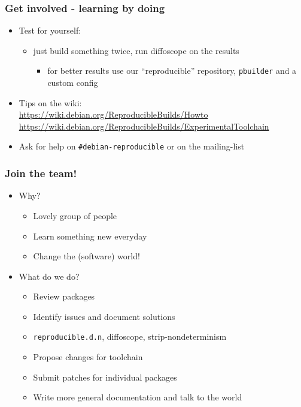 \documentclass[14pt]{beamer}
\begin{document}
\begin{frame}
 \frametitle{Get involved - learning by doing}

 \begin{itemize}
  \item Test for yourself:
   \begin{itemize}
    \item just build something twice, run diffoscope on the results
    \begin{itemize}
     \item for better results use our “reproducible” repository, \texttt{pbuilder} and a custom config
    \end{itemize}
   \end{itemize}
  \item Tips on the wiki: \\
    \small{\url{https://wiki.debian.org/ReproducibleBuilds/Howto}} \\
    \small{\url{https://wiki.debian.org/ReproducibleBuilds/ExperimentalToolchain}}
  \item Ask for help on \texttt{\#debian-reproducible} or on the mailing-list
 \end{itemize}
\end{frame}

\begin{frame}
 \frametitle{Join the team!}

 \begin{itemize}
  \item Why?
   \begin{itemize}
    \item \heartsuit{}\heartsuit{}\heartsuit{} Lovely group of people \heartsuit{}\heartsuit{}\heartsuit{}
    \item Learn something new everyday
    \item Change the (software) world!
   \end{itemize}
  \item What do we do?
   \begin{itemize}
    \item Review packages
    \item Identify issues and document solutions
    \item \texttt{reproducible.d.n}, diffoscope, strip-nondeterminism
    \item Propose changes for toolchain
    \item Submit patches for individual packages
    \item Write more general documentation and talk to the world
   \end{itemize}
 \end{itemize}
\end{frame}
\end{document}
